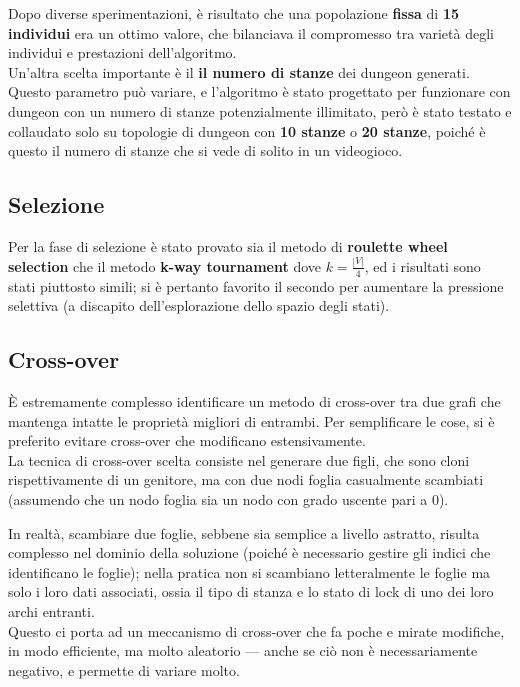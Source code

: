 \documentclass[12pt,titlepage]{article}
\begin{document}
Dopo diverse sperimentazioni, è risultato che una popolazione \textbf{fissa} di \textbf{15 individui} era un ottimo valore, che bilanciava il compromesso tra varietà degli individui e prestazioni dell'algoritmo.\\

\noindent Un'altra scelta importante è il \textbf{il numero di stanze} dei dungeon generati. Questo parametro può variare, e l'algoritmo è stato progettato per funzionare con dungeon con un numero di stanze potenzialmente illimitato, però è stato testato e collaudato solo su topologie di dungeon con \textbf{10 stanze} o \textbf{20 stanze}, poiché è questo il numero di stanze che si vede di solito in un videogioco.

\subsection {Selezione}

Per la fase di selezione è stato provato sia il metodo di \textbf{roulette wheel selection} che il metodo \textbf{k-way tournament} dove $k = \frac{|V|}{4}$, ed i risultati sono stati piuttosto simili; si è pertanto favorito il secondo per aumentare la pressione selettiva (a discapito dell'esplorazione dello spazio degli stati).

\subsection {Cross-over}

È estremamente complesso identificare un metodo di cross-over tra due grafi che mantenga intatte le proprietà migliori di entrambi. Per semplificare le cose, si è preferito evitare cross-over che modificano estensivamente.\\

\noindent La tecnica di cross-over scelta consiste nel generare due figli, che sono cloni rispettivamente di un genitore, ma con due nodi foglia casualmente scambiati (assumendo che un nodo foglia sia un nodo con grado uscente pari a 0).

In realtà, scambiare due foglie, sebbene sia semplice a livello astratto, risulta complesso nel dominio della soluzione (poiché è necessario gestire gli indici che identificano le foglie); nella pratica non si scambiano letteralmente le foglie ma solo i loro dati associati, ossia il tipo di stanza e lo stato di lock di uno dei loro archi entranti.\\

\noindent Questo ci porta ad un meccanismo di cross-over che fa poche e mirate modifiche, in modo efficiente, ma molto aleatorio --- anche se ciò non è necessariamente negativo, e permette di variare molto.
\end{document}
